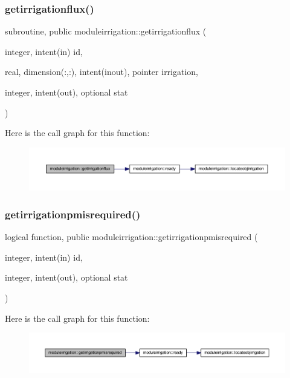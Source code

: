 \subsubsection{\texorpdfstring{getirrigationflux()}{getirrigationflux()}}
{\footnotesize\ttfamily subroutine, public moduleirrigation\+::getirrigationflux (\begin{DoxyParamCaption}\item[{integer, intent(in)}]{id,  }\item[{real, dimension(\+:,\+:), intent(inout), pointer}]{irrigation,  }\item[{integer, intent(out), optional}]{stat }\end{DoxyParamCaption})}

Here is the call graph for this function\+:\nopagebreak
\begin{figure}[H]
\begin{center}
\leavevmode
\includegraphics[width=350pt]{namespacemoduleirrigation_affdb4d2e7e0c67d2c459ff6596babad9_cgraph}
\end{center}
\end{figure}
\mbox{\label{namespacemoduleirrigation_a051749a8f8467229fbb8e6e300b32c9d}} 
\subsubsection{\texorpdfstring{getirrigationpmisrequired()}{getirrigationpmisrequired()}}
{\footnotesize\ttfamily logical function, public moduleirrigation\+::getirrigationpmisrequired (\begin{DoxyParamCaption}\item[{integer, intent(in)}]{id,  }\item[{integer, intent(out), optional}]{stat }\end{DoxyParamCaption})}

Here is the call graph for this function\+:\nopagebreak
\begin{figure}[H]
\begin{center}
\leavevmode
\includegraphics[width=350pt]{namespacemoduleirrigation_a051749a8f8467229fbb8e6e300b32c9d_cgraph}
\end{center}
\end{figure}
\mbox{\label{namespacemoduleirrigation_a23127929f74fe2c391dc8ddec9c8d44d}} 
